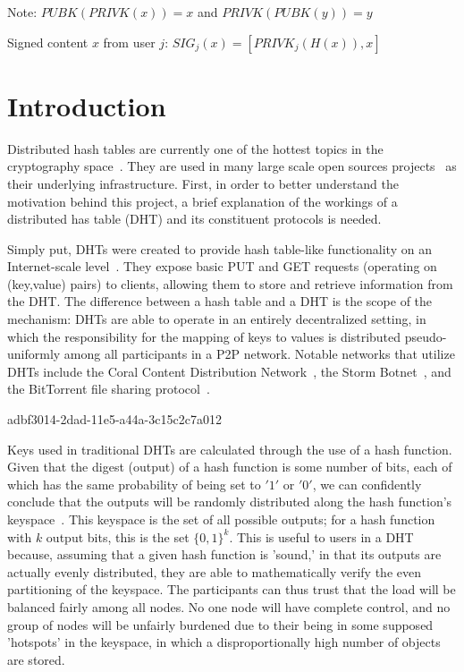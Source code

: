 \documentclass[12pt]{article}
\begin{document}
Note: $PUBK(PRIVK(x)) = x$ and $PRIVK(PUBK(y)) = y$~

Signed content $x$ from user $j$: $SIG_j(x) = \left[ PRIVK_j( H(x) ), x \right]$

\section{Introduction}
\par Distributed hash tables are currently one of the hottest topics in the cryptography space~\cite{Stoica:2001dj,Rowstron:2001ea,Ratnasamy:2001wn}. They are used in many large scale open sources projects~\cite{Freitas:2013tb,Xu:2010vs,Perfitt:2010fh} as their underlying infrastructure. First, in order to better understand the motivation behind this project, a brief explanation of the workings of a distributed has table (DHT) and its constituent protocols is needed.

\par Simply put, DHTs were created to provide hash table-like functionality on an Internet-scale level~\cite{Ratnasamy:2001wn}. They expose basic PUT and GET requests (operating on (key,value) pairs) to clients, allowing them to store and retrieve information from the DHT. The difference between a hash table and a DHT is the scope of the mechanism: DHTs are able to operate in an entirely decentralized setting, in which the responsibility for the mapping of keys to values is distributed pseudo-uniformly among all participants in a P2P network. Notable networks that utilize DHTs include the Coral Content Distribution Network~\cite{Freedman:2004vb}, the Storm Botnet~\cite{Holz:2008uk}, and the BitTorrent file sharing protocol~\cite{Cohen:y1_8mBnw}.

adbf3014-2dad-11e5-a44a-3c15c2c7a012\par Keys used in traditional DHTs are calculated through the use of a hash function. Given that the digest (output) of a hash function is some number of bits, each of which has the same probability of being set to $'1'$ or $'0'$, we can confidently conclude that the outputs will be randomly distributed along the hash function's keyspace~. This keyspace is the set of all possible outputs; for a hash function with $k$ output bits, this is the set $\{0,1\}^k$. This is useful to users in a DHT because, assuming that a given hash function is 'sound,' in that its outputs are actually evenly distributed, they are able to mathematically verify the even partitioning of the keyspace. The participants can thus trust that the load will be balanced fairly among all nodes. No one node will have complete control, and no group of nodes will be unfairly burdened due to their being in some supposed 'hotspots' in the keyspace, in which a disproportionally high number of objects are stored.~
\end{document}

